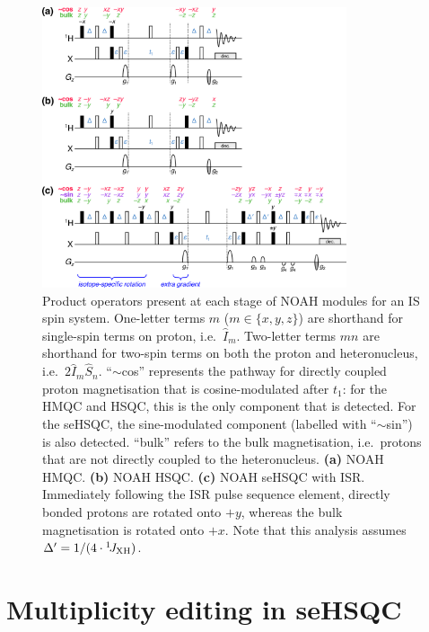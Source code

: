 \begin{figure}
    \centering
    \includegraphics[width=0.8\textwidth]{./figures/pprogs_prodop.png}
    \caption{
        Product operators present at each stage of NOAH modules for an IS spin system.
        One-letter terms $m$ ($m \in \{x, y, z\}$) are shorthand for single-spin terms on proton, i.e.\ $\hat{I}_m$.
        Two-letter terms $mn$ are shorthand for two-spin terms on both the proton and heteronucleus, i.e.\ $2\hat{I}_m\hat{S}_n$.
        ``$\sim$cos'' represents the pathway for directly coupled proton magnetisation that is cosine-modulated after $t_1$: for the HMQC and HSQC, this is the only component that is detected.
        For the seHSQC, the sine-modulated component (labelled with ``$\sim$sin'') is also detected.
        ``bulk'' refers to the bulk magnetisation, i.e.\ protons that are not directly coupled to the heteronucleus.
        \textbf{(a)} NOAH HMQC.
        \textbf{(b)} NOAH HSQC.
        \textbf{(c)} NOAH seHSQC with ISR.
        Immediately following the ISR pulse sequence element, directly bonded protons are rotated onto $+y$, whereas the bulk magnetisation is rotated onto $+x$.
        Note that this analysis assumes $\Delta' = 1/(4\cdot\onejxh)$.
    }
    \label{fig:pprogs_prodop}
\end{figure}

\section{Multiplicity editing in seHSQC}

